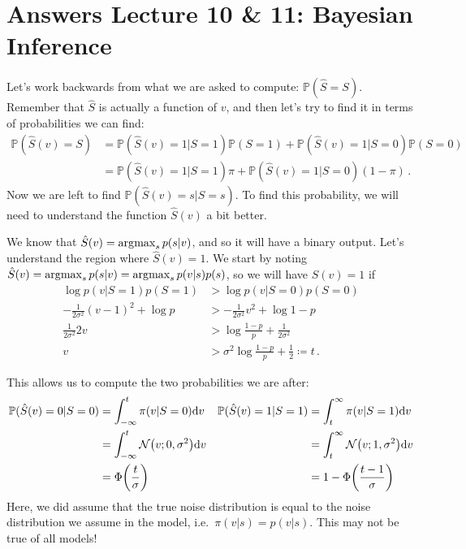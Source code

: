 \section{Answers Lecture 10 \& 11: Bayesian Inference}

\paragraph{}
Let's work backwards from what we are asked to compute: $\mathbb{P}(\hat S = S)$. Remember that $\hat S$ is actually a function of $v$, and then let's try to find it in terms of probabilities we can find:
\begin{align}
\mathbb P(\hat S(v) = S) &= \mathbb P(\hat S(v) = 1|S=1)\mathbb P(S=1) + \mathbb P(\hat S(v) = 1|S=0)\mathbb P(S=0) \\
&=\mathbb P(\hat S(v) = 1|S=1) \pi + \mathbb P(\hat S(v) = 1|S=0) (1-\pi) \,.
\end{align}
Now we are left to find $\mathbb P(\hat S(v) = s|S=s)$. To find this probability, we will need to understand the function $\hat S(v)$ a bit better.

We know that $\hat S(v) = \operatorname*{\arg\!\max}_s p(s|v)$, and so it will have a binary output. Let's understand the region where $\hat S(v) = 1$. We start by noting $\hat S(v) = \operatorname*{\arg\!\max}_s p(s|v) = \operatorname*{\arg\!\max}_s p(v|s)p(s)$, so we will have $\hat S(v) = 1$ if
\begin{align}
\log p(v|S=1)p(S=1) &> \log p(v|S=0)p(S=0) \\
-\frac{1}{2\sigma^2}(v-1)^2 + \log p &> -\frac{1}{2\sigma^2}v^2 + \log 1-p \\
\frac{1}{2\sigma^2}2v &> \log \frac{1-p}{p} + \frac{1}{2\sigma^2} \\
v &> \sigma^2\log \frac{1-p}{p} + \frac{1}{2} \coloneqq t \,.
\end{align}

This allows us to compute the two probabilities we are after:
\begin{align}
\mathbb P(\hat S(v) = 0|S=0) &= \int_{-\infty}^t \pi(v|S=0)\calcd v &
\mathbb P(\hat S(v) = 1|S=1) &= \int_{t}^\infty \pi(v|S=1)\calcd v \\
&= \int_{-\infty}^t \NormDist{v; 0, \sigma^2} \calcd v & &= \int_t^\infty \NormDist{v; 1, \sigma^2}\calcd v \\
&= \Phi\left(\frac{t}{\sigma}\right) & &= 1-\Phi\left(\frac{t-1}{\sigma}\right)
\end{align}
Here, we did assume that the true noise distribution is equal to the noise distribution we assume in the model, i.e.~$\pi(v|s) = p(v|s)$. This may not be true of all models!

